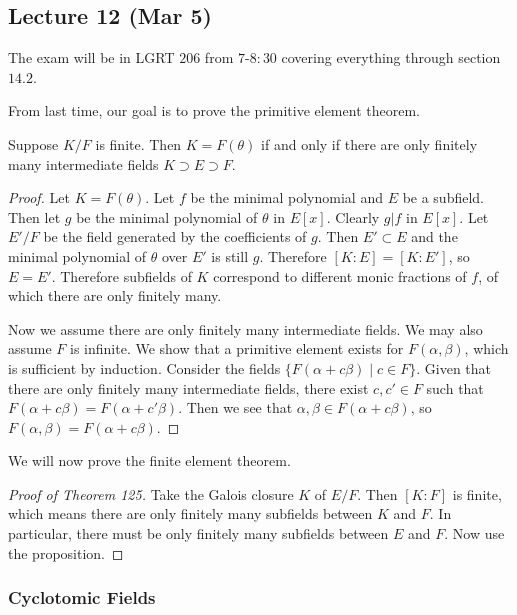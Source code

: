 \message{ !name(notes.tex)}\documentclass[10pt, twoside]{article}
\begin{document}
        \subsection{Lecture 12 (Mar 5)}
        
        The exam will be in LGRT $206$ from $7$-$8:30$ covering everything through section $14.2$.
        
        From last time, our goal is to prove the primitive element theorem.

        \begin{prop}
            Suppose $K/F$ is finite. Then $K = F(\theta)$ if and only if there are only finitely many intermediate fields $K \supset E \supset F$.
            \begin{proof}
                Let $K = F(\theta)$. Let $f$ be the minimal polynomial and $E$ be a subfield. Then let $g$ be the minimal polynomial of $\theta$ in $E[x]$. Clearly $g | f$ in $E[x]$. Let $E'/F$ be the field generated by the coefficients of $g$. Then $E' \subset E$ and the minimal polynomial of $\theta$ over $E'$ is still $g$. Therefore $[K:E] = [K:E']$, so $E = E'$. Therefore subfields of $K$ correspond to different monic fractions of $f$, of which there are only finitely many.

                Now we assume there are only finitely many intermediate fields. We may also assume $F$ is infinite. We show that a primitive element exists for $F(\alpha, \beta)$, which is sufficient by induction. Consider the fields $\{F(\alpha+c\beta) \mid c \in F\}$. Given that there are only finitely many intermediate fields, there exist $c,c' \in F$ such that $F(\alpha+c\beta) = F(\alpha+c'\beta)$. Then we see that $\alpha,\beta \in F(\alpha+c\beta)$, so $F(\alpha, \beta) = F(\alpha+c\beta)$.
            \end{proof}
        \end{prop}

        We will now prove the finite element theorem.
        \begin{proof}[Proof of Theorem 125]
            Take the Galois closure $K$ of $E/F$. Then $[K:F]$ is finite, which means there are only finitely many subfields between $K$ and $F$. In particular, there must be only finitely many subfields between $E$ and $F$. Now use the proposition.
        \end{proof}

        \subsubsection{Cyclotomic Fields}
        
\end{document}
